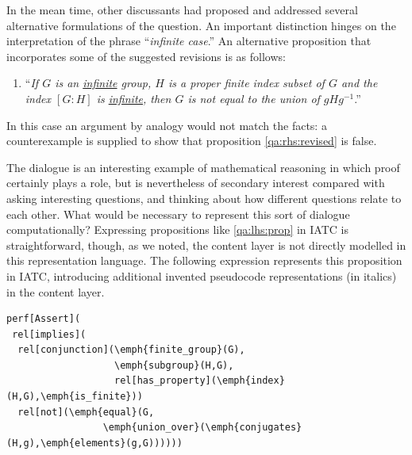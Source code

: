 \documentclass[smallextended,oneside]{svjour3}       %
\begin{document}
{In the mean time, other discussants had proposed and addressed several
alternative formulations of the question.  An important distinction hinges on the
interpretation of the phrase ``\emph{infinite case}.''
An alternative proposition that incorporates some of the suggested
revisions is as follows:
\begin{enumerate}[start=2,label=(\emph{P\arabic*}$^\prime$),ref=(\emph{P\arabic*}$^\prime$),leftmargin=1cm]
\item ``\emph{If $G$ is an \uline{infinite} group, $H$ is a proper finite index subset of $G$
  and the index $[G \mathop{:} H]$ is \uline{infinite}, then $G$ is not equal to
  the union of $gHg^{-1}$}.'' \label{qa:rhs:revised}
\end{enumerate}
In this case an argument by analogy would not match the facts:
a counterexample is supplied to show that proposition \ref{qa:rhs:revised} is false.

The dialogue is an interesting example of mathematical reasoning in
which proof certainly plays a role, but is nevertheless of secondary
interest compared with asking interesting questions, and thinking
about how different questions relate to each other.
What would be necessary to represent this sort of dialogue computationally?
Expressing propositions like \ref{qa:lhs:prop} in IATC is 
straightforward, though, as we noted, the content layer is not
directly modelled in this representation language.  The
following expression represents this proposition in IATC, introducing
additional invented pseudocode representations (in italics) in the content layer.

\begin{Verbatim}[commandchars=\\\{\}]
perf[Assert](
 rel[implies](
  rel[conjunction](\emph{finite_group}(G),
                   \emph{subgroup}(H,G),
                   rel[has_property](\emph{index}(H,G),\emph{is_finite}))
  rel[not](\emph{equal}(G,
                 \emph{union_over}(\emph{conjugates}(H,g),\emph{elements}(g,G))))))
\end{Verbatim}

}
\end{document}
